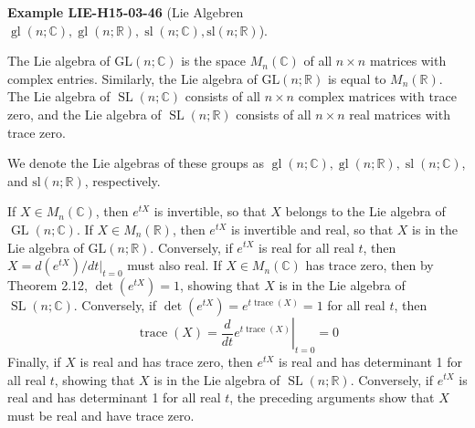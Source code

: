 \documentclass[10pt, letterpaper]{article}
\newcommand{\CustomHeading}[3]{%
  \par\medskip\noindent%
  \textbf{#1 #2} \textnormal{(#3)}.\enskip%
}
\newenvironment{EXA}[2]{\CustomHeading{Example}{#1}{#2}}{}
\begin{document}
\begin{EXA}{LIE-H15-03-46}{Lie Algebren $\operatorname{gl}(n ; \mathbb{C}), \operatorname{gl}(n ; \mathbb{R}), \operatorname{sl}(n ; \mathbb{C}), \mathrm{sl}(n ; \mathbb{R})$}
The Lie algebra of $\mathrm{GL}(n ; \mathbb{C})$ is the space $M_{n}(\mathbb{C})$ of all $n \times n$ matrices with complex entries. Similarly, the Lie algebra of $\mathrm{GL}(n ; \mathbb{R})$ is equal to $M_{n}(\mathbb{R})$. The Lie algebra of $\operatorname{SL}(n ; \mathbb{C})$ consists of all $n \times n$ complex matrices with trace zero, and the Lie algebra of $\operatorname{SL}(n ; \mathbb{R})$ consists of all $n \times n$ real matrices with trace zero.

We denote the Lie algebras of these groups as $\operatorname{gl}(n ; \mathbb{C}), \operatorname{gl}(n ; \mathbb{R}), \operatorname{sl}(n ; \mathbb{C})$, and $\mathrm{sl}(n ; \mathbb{R})$, respectively.

If $X \in M_{n}(\mathbb{C})$, then $e^{t X}$ is invertible, so that $X$ belongs to the Lie algebra of $\operatorname{GL}(n ; \mathbb{C})$. If $X \in M_{n}(\mathbb{R})$, then $e^{t X}$ is invertible and real, so that $X$ is in the Lie algebra of $\mathrm{GL}(n ; \mathbb{R})$. Conversely, if $e^{t X}$ is real for all real $t$, then $X= d\left(e^{t X}\right) /\left.d t\right|_{t=0}$ must also real. If $X \in M_{n}(\mathbb{C})$ has trace zero, then by Theorem 2.12, $\operatorname{det}\left(e^{t X}\right)=1$, showing that $X$ is in the Lie algebra of $\operatorname{SL}(n ; \mathbb{C})$. Conversely, if $\operatorname{det}\left(e^{t X}\right)=e^{t \operatorname{trace}(X)}=1$ for all real $t$, then
$$
\operatorname{trace}(X)=\left.\frac{d}{d t} e^{t \operatorname{trace}(X)}\right|_{t=0}=0
$$
Finally, if $X$ is real and has trace zero, then $e^{t X}$ is real and has determinant 1 for all real $t$, showing that $X$ is in the Lie algebra of $\operatorname{SL}(n ; \mathbb{R})$. Conversely, if $e^{t X}$ is real and has determinant 1 for all real $t$, the preceding arguments show that $X$ must be real and have trace zero.
\end{EXA}
\end{document}

